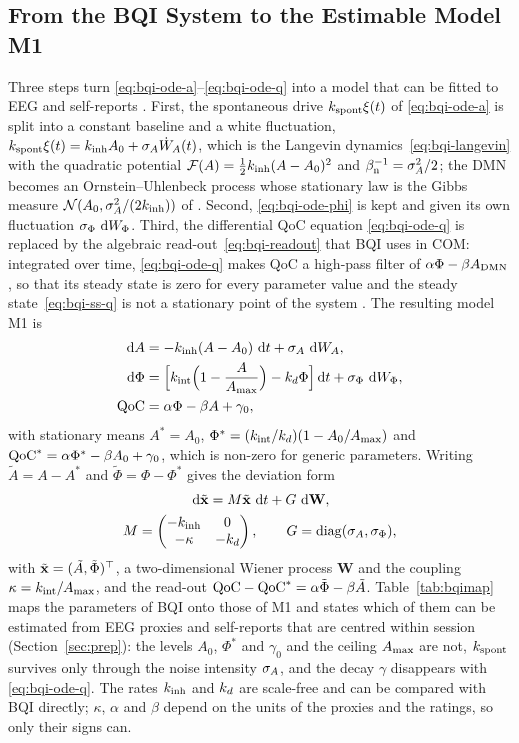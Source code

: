 \subsection{From the BQI System to the Estimable Model M1}
\label{sec:theory-m1}
Three steps turn \eqref{eq:bqi-ode-a}--\eqref{eq:bqi-ode-q} into a model that can be fitted to EEG and self-reports \cite{companion}. First, the spontaneous drive $k_{\mathrm{spont}}\xi(t)$ of \eqref{eq:bqi-ode-a} is split into a constant baseline and a white fluctuation, $k_{\mathrm{spont}}\xi(t)=k_{\mathrm{inh}} A_0+\sigma_{A}\dot W_A(t)$, which is the Langevin dynamics~\eqref{eq:bqi-langevin} with the quadratic potential $\mathcal F(A)=\tfrac12k_{\mathrm{inh}}(A-A_0)^2$ and $\beta_{\mathrm n}^{-1}=\sigma_{A}^2/2$; the DMN becomes an Ornstein--Uhlenbeck process whose stationary law is the Gibbs measure $\mathcal N(A_0,\sigma_{A}^2/(2k_{\mathrm{inh}}))$ of \cite[eq.~(85)]{BQI}. Second, \eqref{eq:bqi-ode-phi} is kept and given its own fluctuation $\sigma_{\Phi}\,\,\mathrm{d} W_\Phi$. Third, the differential QoC equation \eqref{eq:bqi-ode-q} is replaced by the algebraic read-out~\eqref{eq:bqi-readout} that BQI uses in COM: integrated over time, \eqref{eq:bqi-ode-q} makes QoC a high-pass filter of $\alpha\Phi-\beta A_{\mathrm{DMN}}$, so that its steady state is zero for every parameter value and the steady state~\eqref{eq:bqi-ss-q} \cite[eq.~(57)]{BQI} is not a stationary point of the system \cite{companion}. The resulting model M1 is
\begin{align}
  \,\mathrm{d} A&=-k_{\mathrm{inh}}(A-A_0)\,\,\mathrm{d} t+\sigma_{A}\,\,\mathrm{d} W_A, \label{eq:m1-a}\\
  \,\mathrm{d}\Phi&=\Bigl[k_{\mathrm{int}}\Bigl(1-\frac{A}{A_{\max}}\Bigr)-k_{d}\Phi\Bigr]\,\mathrm{d} t+\sigma_{\Phi}\,\,\mathrm{d} W_\Phi, \label{eq:m1-phi}\\
  \mathrm{QoC}&=\alpha\Phi-\beta A+\gamma_0, \label{eq:m1-q}
\end{align}
with stationary means $A^*=A_0$, $\Phi^*=(k_{\mathrm{int}}/k_{d})(1-A_0/A_{\max})$ and $\mathrm{QoC}^*=\alpha\Phi^*-\beta A_0+\gamma_0$, which is non-zero for generic parameters. Writing $\tilde A=A-A^*$ and $\tilde\Phi=\Phi-\Phi^*$ gives the deviation form
\begin{equation}
  \begin{gathered}
  \,\mathrm{d}\tilde{\mathbf{x}}=M\tilde{\mathbf{x}}\,\,\mathrm{d} t+G\,\,\mathrm{d}\mathbf W,\\
  M=\begin{pmatrix}-k_{\mathrm{inh}}&0\\-\kappa&-k_{d}\end{pmatrix},\qquad
  G=\operatorname{diag}(\sigma_{A},\sigma_{\Phi}),
  \end{gathered}
  \label{eq:m1}
\end{equation}
with $\tilde{\mathbf{x}}=(\tilde A,\tilde\Phi)^\top$, a two-dimensional Wiener process $\mathbf W$ and the coupling $\kappa=k_{\mathrm{int}}/A_{\max}$, and the read-out $\mathrm{QoC}-\mathrm{QoC}^*=\alpha\tilde\Phi-\beta\tilde A$. Table~\ref{tab:bqimap} maps the parameters of BQI onto those of M1 and states which of them can be estimated from EEG proxies and self-reports that are centred within session (Section~\ref{sec:prep}): the levels $A_0$, $\Phi^*$ and $\gamma_0$ and the ceiling $A_{\max}$ are not, $k_{\mathrm{spont}}$ survives only through the noise intensity $\sigma_{A}$, and the decay $\gamma$ disappears with \eqref{eq:bqi-ode-q}. The rates $k_{\mathrm{inh}}$ and $k_{d}$ are scale-free and can be compared with BQI directly; $\kappa$, $\alpha$ and $\beta$ depend on the units of the proxies and the ratings, so only their signs can.

